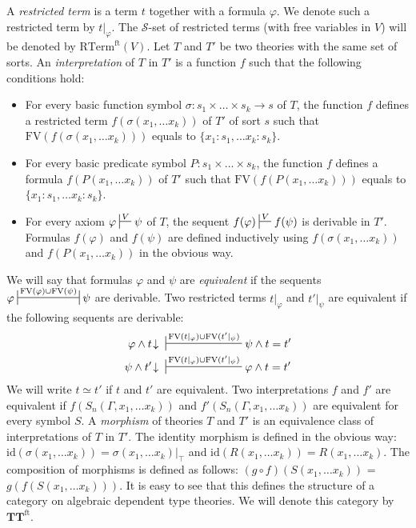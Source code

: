 \documentclass[reqno]{amsart}
\theoremstyle{definition}
\theoremstyle{remark}
\newcommand{\fs}[1]{\mathrm{#1}}
\newcommand{\RTerm}{\fs{RTerm}}
\newcommand{\FV}{\fs{FV}}
\newcommand{\ft}{\fs{ft}}
\newcommand{\id}{\fs{id}}
\newcommand{\cat}[1]{\mathbf{#1}}
\newcommand{\algtt}{\cat{TT}}
\numberwithin{figure}{section}
\begin{document}
A \emph{restricted term} is a term $t$ together with a formula $\varphi$.
We denote such a restricted term by $t|_\varphi$.
The $\mathcal{S}$-set of restricted terms (with free variables in $V$) will be denoted by $\RTerm^\ft(V)$.
Let $T$ and $T'$ be two theories with the same set of sorts.
An \emph{interpretation} of $T$ in $T'$ is a function $f$ such that the following conditions hold:
\begin{itemize}
\item For every basic function symbol $\sigma : s_1 \times \ldots \times s_k \to s$ of $T$,
the function $f$ defines a restricted term $f(\sigma(x_1, \ldots x_k))$ of $T'$ of sort $s$ such that $\FV(f(\sigma(x_1, \ldots x_k)))$ equals to $\{ x_1 : s_1, \ldots x_k : s_k \}$.
\item For every basic predicate symbol $P : s_1 \times \ldots \times s_k$,
the function $f$ defines a formula $f(P(x_1, \ldots x_k))$ of $T'$ such that $\FV(f(P(x_1, \ldots x_k)))$ equals to $\{ x_1 : s_1, \ldots x_k : s_k \}$.
\item For every axiom $\varphi \sststile{}{V} \psi$ of $T$, the sequent $f(\varphi) \sststile{}{V} f(\psi)$ is derivable in $T'$.
Formulas $f(\varphi)$ and $f(\psi)$ are defined inductively using $f(\sigma(x_1, \ldots x_k))$ and $f(P(x_1, \ldots x_k))$ in the obvious way.
\end{itemize}

We will say that formulas $\varphi$ and $\psi$ are \emph{equivalent} if the sequents $\varphi \ssststile{}{\FV(\varphi) \cup \FV(\psi)} \psi$ are derivable.
Two restricted terms $t|_\varphi$ and $t'|_\psi$ are equivalent if the following sequents are derivable:
\begin{align*}
\varphi \land t\!\downarrow\ & \sststile{}{\FV(t|_\varphi) \cup \FV(t'|_\psi)} \psi \land t = t' \\
\psi \land t'\!\downarrow\ & \sststile{}{\FV(t|_\varphi) \cup \FV(t'|_\psi)} \varphi \land t = t'
\end{align*}
We will write $t \simeq t'$ if $t$ and $t'$ are equivalent.
Two interpretations $f$ and $f'$ are equivalent if $f(S_n(\Gamma, x_1, \ldots x_k))$ and $f'(S_n(\Gamma, x_1, \ldots x_k))$ are equivalent for every symbol $S$.
A \emph{morphism} of theories $T$ and $T'$ is an equivalence class of interpretations of $T$ in $T'$.
The identity morphism is defined in the obvious way: $\id(\sigma(x_1, \ldots x_k)) = \sigma(x_1, \ldots x_k)|_\top$ and $\id(R(x_1, \ldots x_k)) = R(x_1, \ldots x_k)$.
The composition of morphisms is defined as follows: $(g \circ f)(S(x_1, \ldots x_k))$ = $g(f(S(x_1, \ldots x_k)))$.
It is easy to see that this defines the structure of a category on algebraic dependent type theories.
We will denote this category by $\algtt^\ft$.
\end{document}
